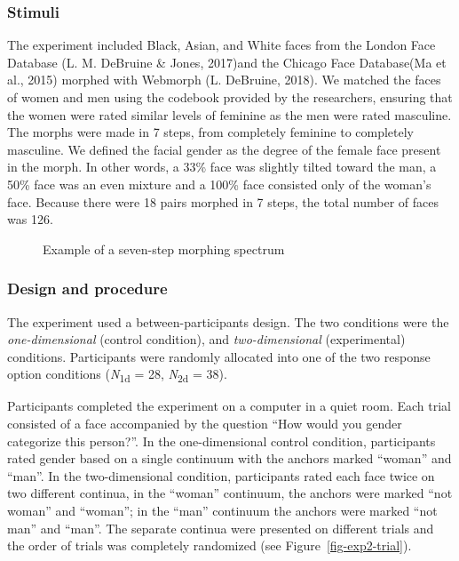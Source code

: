 \documentclass[
  man,
  longtable,
  nolmodern,
  notxfonts,
  notimes,
  colorlinks=true,linkcolor=blue,citecolor=blue,urlcolor=blue]{apa7}
\begin{document}
\subsubsection{Stimuli}\label{stimuli}

The experiment included Black, Asian, and White faces from the London
Face Database (L. M. DeBruine \& Jones, 2017)and the Chicago Face
Database(Ma et al., 2015) morphed with Webmorph (L. DeBruine, 2018). We
matched the faces of women and men using the codebook provided by the
researchers, ensuring that the women were rated similar levels of
feminine as the men were rated masculine. The morphs were made in 7
steps, from completely feminine to completely masculine. We defined the
facial gender as the degree of the female face present in the morph. In
other words, a 33\% face was slightly tilted toward the man, a 50\% face
was an even mixture and a 100\% face consisted only of the woman's face.
Because there were 18 pairs morphed in 7 steps, the total number of
faces was 126.

\begin{figure}

\caption{\label{fig-stimuli}Example of a seven-step morphing spectrum}


\end{figure}%

\subsubsection{Design and procedure}\label{design-and-procedure}

The experiment used a between-participants design. The two conditions
were the \emph{one-dimensional} (control condition), and
\emph{two-dimensional} (experimental) conditions. Participants were
randomly allocated into one of the two response option conditions
(\emph{N}\textsubscript{1d} = 28, \emph{N}\textsubscript{2d} = 38).

Participants completed the experiment on a computer in a quiet room.
Each trial consisted of a face accompanied by the question ``How would
you gender categorize this person?''. In the one-dimensional control
condition, participants rated gender based on a single continuum with
the anchors marked ``woman'' and ``man''. In the two-dimensional
condition, participants rated each face twice on two different continua,
in the ``woman'' continuum, the anchors were marked ``not woman'' and
``woman''; in the ``man'' continuum the anchors were marked ``not man''
and ``man''. The separate continua were presented on different trials
and the order of trials was completely randomized (see
Figure~\ref{fig-exp2-trial}).
\end{document}
